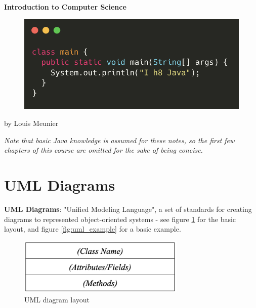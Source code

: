\documentclass[12pt]{article}
\begin{document}
\begin{titlepage}
    \begin{center}
        \vspace*{1cm}
        \Huge
        \textbf{Introduction to Computer Science}
        
        \vfill
        
        \begin{figure}[!ht]
            \centering
            \includegraphics{misc/TITLEGRAPHIC.png}
        \end{figure}
        \vfill
        
        \small
        by Louis Meunier
        
        \href{https://notes.louismeunier.net}{\color{violet}{notes.louismeunier.net}}
        
    \end{center}
\end{titlepage}


{
  \hypersetup{linkcolor=violet}
  \tableofcontents
}

\newpage

\textit{Note that basic Java knowledge is assumed for these notes, so the first few chapters of this course are omitted for the sake of being concise.}

\section{UML Diagrams}

\textbf{UML Diagrams}: "Unified Modeling Language", a set of standards for creating diagrams to represented object-oriented systems - see figure \ref{fig:uml} for the basic layout, and figure \ref{fig:uml_example} for a basic example.

\begin{figure}[!ht]
    \centering
    \includegraphics[width=8cm]{misc/uml.png}
    \caption{UML diagram layout}
    \label{fig:uml}
\end{figure}
\end{document}
